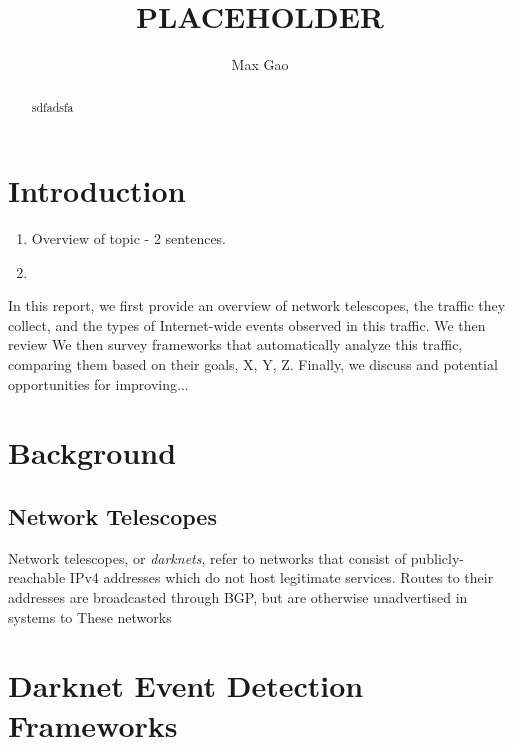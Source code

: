 \documentclass[manuscript,nonacm]{acmart}
\begin{document}
\title{PLACEHOLDER}
\author{Max Gao}

\begin{abstract}
sdfadsfa
\end{abstract}

\maketitle

\section{Introduction}

\begin{enumerate}
  \item Overview of topic - 2 sentences.
  \item 
\end{enumerate}

In this report, we first provide an overview of network telescopes, the traffic they collect, and the types of Internet-wide events observed in this traffic.
We then review 
We then survey frameworks that automatically analyze this traffic, comparing them based on their goals, X, Y, Z.
Finally, we discuss and potential opportunities for improving...

\section{Background}

\subsection{Network Telescopes}

Network telescopes, or \textit{darknets}, refer to networks that consist of publicly-reachable IPv4 addresses which do not host legitimate services.
Routes to their addresses are broadcasted through BGP, but are otherwise unadvertised in systems to 
These networks 




\section{Darknet Event Detection Frameworks}
\end{document}
